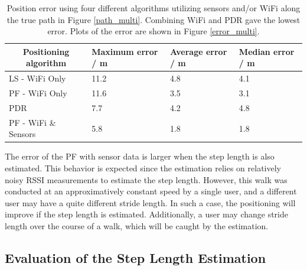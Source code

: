 \documentclass{LTHthesis}
\begin{document}
\begin{table}[!hbt]
\begin{center}
\begin{tabular}{|l|l|l|l|}
\hline
\multicolumn{1}{|c|}{Positioning algorithm} & Maximum error / m & Average error / m  & Median error / m \\
\hline
\hline
LS - WiFi Only & 11.2 & 4.8 & 4.1 \\
\hline
PF - WiFi Only & 11.6 & 3.5 & 3.1  \\
\hline
PDR & 7.7 & 4.2 & 4.8  \\
\hline
PF - WiFi \& Sensors & 5.8 & 1.8 & 1.8 \\
\hline
\end{tabular}
\end{center}
\caption{Position error using four different algorithms utilizing sensors and/or WiFi along the true path in Figure \ref{path_multi}. Combining WiFi and PDR gave the lowest error. Plots of the error are shown in Figure \ref{error_multi}.} \label{table:error_different_algorithms}
\end{table}

The error of the PF with sensor data is larger when the step length is also estimated. This behavior is expected since the estimation relies on relatively noisy RSSI measurements to estimate the step length. However, this walk was conducted at an approximatively constant speed by a single user, and a different user may have a quite different stride length. In such a case, the positioning will improve if the  step length is estimated. Additionally, a user may change stride length over the course of a walk, which will be caught by the estimation.  
%

\subsection{Evaluation of the Step Length Estimation}
\end{document}
